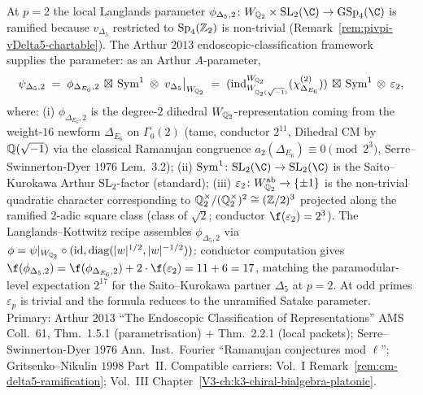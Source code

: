 \begin{remark}[Explicit $p = 2$ ramified local Langlands parameter $\phi_{\Delta_5,2}$]
\label{rem:pivpi-langlands-p2}
At $p = 2$ the local Langlands parameter
$\phi_{\Delta_5, 2} \colon W_{\Q_2} \times \mathrm{SL}_2(\C)
\to \mathrm{GSp}_4(\C)$ is ramified because
$v_{\Delta_5}$ restricted to $\mathrm{Sp}_4(\mathbb{Z}_2)$ is non-trivial
(Remark~\ref{rem:pivpi-vDelta5-chartable}). The Arthur $2013$
endoscopic-classification framework
\cite[Thm.\ 1.5.1 and Thm.\ 2.2.1]{Arthur2013Endoscopic} supplies the
parameter: as an Arthur $A$-parameter,
\[
 \psi_{\Delta_5, 2}
 \;=\; \phi_{\Delta_{E_6}, 2} \,\boxtimes\, \mathrm{Sym}^1
 \;\otimes\; v_{\Delta_5}\big|_{W_{\mathbb{Q}_2}}
 \;=\; (\mathrm{ind}^{W_{\mathbb{Q}_2}}_{W_{\mathbb{Q}_2(\sqrt{-1})}}(\chi_{\Delta_{E_6}}^{(2)}))
 \,\boxtimes\, \mathrm{Sym}^1
 \,\otimes\, \varepsilon_2,
\]
where: (i) $\phi_{\Delta_{E_6}, 2}$ is the degree-$2$ dihedral
$W_{\mathbb{Q}_2}$-representation coming from the weight-$16$ newform
$\Delta_{E_6}$ on $\Gamma_0(2)$ (tame, conductor $2^{11}$, Dihedral CM
by $\mathbb{Q}(\sqrt{-1})$ via the classical Ramanujan
congruence $a_2(\Delta_{E_6}) \equiv 0 \pmod{2^3}$,
Serre--Swinnerton-Dyer $1976$ Lem.\ 3.2);
(ii) $\mathrm{Sym}^1 \colon \mathrm{SL}_2(\C) \to \mathrm{SL}_2(\C)$
is the Saito--Kurokawa Arthur $\mathrm{SL}_2$-factor (standard);
(iii) $\varepsilon_2 \colon W_{\mathbb{Q}_2}^{\mathrm{ab}} \to \{\pm 1\}$ is
the non-trivial quadratic character corresponding to
$\mathbb{Q}_2^\times/(\mathbb{Q}_2^\times)^2 \cong (\mathbb{Z}/2)^3$ projected along the ramified
$2$-adic square class (class of $\sqrt{2}$; conductor $\f(\varepsilon_2)=2^3$).
The Langlands--Kottwitz recipe assembles
$\phi_{\Delta_5, 2}$ via
$\phi = \psi|_{W_{\mathbb{Q}_2}}\circ(\mathrm{id},\mathrm{diag}(|w|^{1/2},|w|^{-1/2}))$:
conductor computation gives
$\f(\phi_{\Delta_5,2}) = \f(\phi_{\Delta_{E_6},2}) + 2\cdot\f(\varepsilon_2) = 11 + 6 = 17$,
matching the paramodular-level expectation $2^{17}$ for the Saito--Kurokawa
partner $\Delta_5$ at $p = 2$. At odd primes $\varepsilon_p$ is trivial
and the formula reduces to the unramified Satake parameter. Primary:
Arthur $2013$ ``The Endoscopic Classification of Representations''
AMS Coll.\ 61, Thm.\ 1.5.1 (parametrisation) + Thm.\ 2.2.1 (local
packets); Serre--Swinnerton-Dyer $1976$ Ann.\ Inst.\ Fourier
``Ramanujan conjectures mod $\ell$''; Gritsenko--Nikulin $1998$ Part~II.
Compatible carriers: Vol.~I Remark~\ref{rem:cm-delta5-ramification};
Vol.~III Chapter~\ref{V3-ch:k3-chiral-bialgebra-platonic}.
\end{remark}


